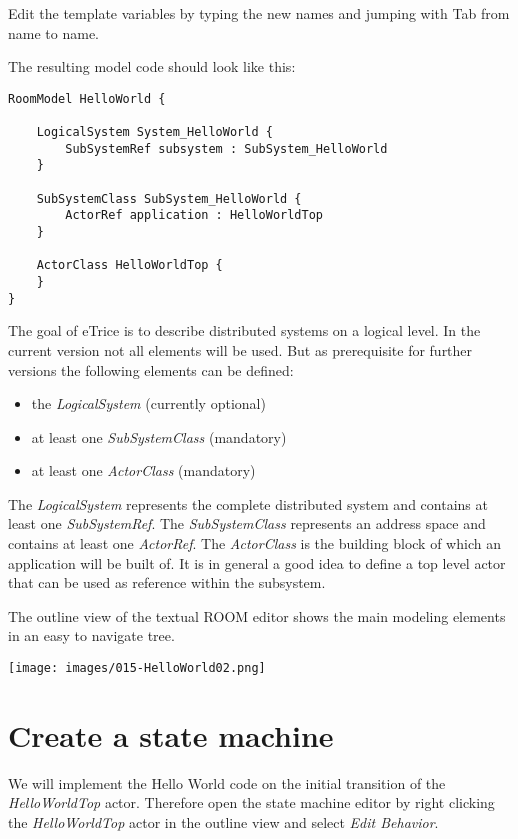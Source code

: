Edit the template variables by typing the new names and jumping with Tab from name to name.

The resulting model code should look like this:

\begin{verbatim}
RoomModel HelloWorld {

    LogicalSystem System_HelloWorld {
        SubSystemRef subsystem : SubSystem_HelloWorld
    }

    SubSystemClass SubSystem_HelloWorld {
        ActorRef application : HelloWorldTop
    }

    ActorClass HelloWorldTop {
    }
} 
\end{verbatim}

The goal of eTrice is to describe distributed systems on a logical level. In the current version not all elements will be used. But as prerequisite for further versions the following elements can be defined:
\begin{itemize}
\item the \textit{LogicalSystem} (currently optional)
\item at least one \textit{SubSystemClass} (mandatory)
\item at least one \textit{ActorClass} (mandatory)
\end{itemize}

The \textit{LogicalSystem} represents the complete distributed system and contains at least one \textit{SubSystemRef}. The \textit{SubSystemClass} represents an address space and contains at least one \textit{ActorRef}. The \textit{ActorClass} is the building block of which an application will be built of. It is in general a good idea to define a top level actor that can be used as reference within the subsystem.

The outline view of the textual ROOM editor shows the main modeling elements in an easy to navigate tree.

\texttt{[image: images/015-HelloWorld02.png]}


\section{Create a state machine}

We will implement the Hello World code on the initial transition of the \textit{HelloWorldTop} actor. Therefore open the state machine editor by right clicking the \textit{HelloWorldTop} actor in the outline view and select \textit{Edit Behavior}.

